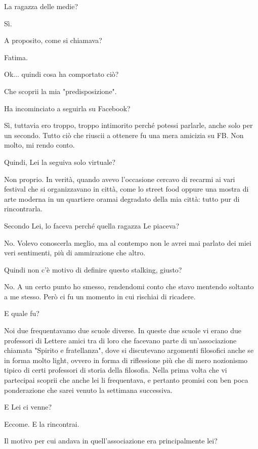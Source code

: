 \documentclass[a4paper,12pt]{article}
\newcommand{\Walter}{\speak{W}}
\newcommand{\Pollazzi}{\speak{P}}
\begin{document}
\begin{dialogue}
\Pollazzi La ragazza delle medie?

\Walter Sì.

\Pollazzi A proposito, come si chiamava?

\Walter Fatima.

\Pollazzi Ok... quindi cosa ha comportato ciò?

\Walter Che scoprii la mia "predisposizione".

\Pollazzi Ha incominciato a seguirla su Facebook?

\Walter Sì, tuttavia ero troppo, troppo intimorito perché potessi parlarle, anche solo per un secondo. Tutto ciò che riuscii a ottenere fu una mera amicizia su FB. Non molto, mi rendo conto.

\Pollazzi Quindi, Lei la seguiva solo virtuale?

\Walter Non proprio. In verità, quando avevo l'occasione cercavo di recarmi ai vari festival che si organizzavano in città, come lo street food oppure una mostra di arte moderna in un quartiere oramai degradato della mia città: tutto pur di rincontrarla.

\Pollazzi Secondo Lei, lo faceva perché quella ragazza Le piaceva?

\Walter No. Volevo conoscerla meglio, ma al contempo non le avrei mai parlato dei miei veri sentimenti, più di ammirazione che altro.

\Pollazzi Quindi non c’è motivo di definire questo stalking, giusto?

\Walter No. A un certo punto ho smesso, rendendomi conto che stavo mentendo soltanto a me stesso. Però ci fu un momento in cui rischiai di ricadere.

\Pollazzi E quale fu?

\Walter Noi due frequentavamo due scuole diverse. In queste due scuole vi erano due professori di Lettere amici tra di loro che facevano parte di un'associazione chiamata "Spirito e fratellanza", dove si discutevano argomenti filosofici anche se in forma molto light, ovvero in forma di riflessione più che di mero nozionismo tipico di certi professori di storia della filosofia. Nella prima volta che vi partecipai scoprii che anche lei li frequentava, e pertanto promisi con ben poca ponderazione che sarei venuto la settimana successiva.

\Pollazzi E Lei ci venne?

\Walter Eccome. E la rincontrai.

\Pollazzi Il motivo per cui andava in quell'associazione era principalmente lei?


\end{dialogue}
\end{document}
